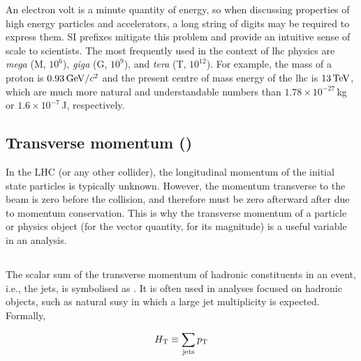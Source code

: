 An electron volt is a minute quantity of energy, so when discussing properties of high energy particles and accelerators, a long string of digits may be required to express them. SI prefixes mitigate this problem and provide an intuitive sense of scale to scientists. The most frequently used in the context of \acrshort{lhc} physics are \emph{mega} (M, $\text{10}^6$), \emph{giga} (G, $\text{10}^9$), and \emph{tera} (T, $\text{10}^{12}$). For example, the mass of a proton is $\text{0.93}\,\text{Ge\hspace{-.08em}V}/c^2$ and the present centre of mass energy of the \acrshort{lhc} is $\text{13}\,\text{Te\hspace{-.08em}V}$, which are much more natural and understandable numbers than $\text{1.78}\times \text{10}^{-27}$\,kg or $\text{1.6}\times \text{10}^{-7}$\,J, respectively.




\subsection{Transverse momentum (\texorpdfstring{\pt}{pt})}
\label{subsec:theory_pt}

In the LHC (or any other collider), the longitudinal momentum of the initial state particles is typically unknown. However, the momentum transverse to the beam is zero before the collision, and therefore must be zero afterward after due to momentum conservation. This is why the transverse momentum of a particle or physics object (\ptvec for the vector quantity, \pt for its magnitude) is a useful variable in an analysis.





\subsection{\texorpdfstring{\HT}{HT}}
\label{subsec:theory_ht}


The scalar sum of the transverse momentum of hadronic constituents in an event, i.e., the \glspl{jet}, is symbolised as \HT. It is often used in analyses focused on hadronic objects, such as natural \acrlong{susy} in which a large jet multiplicity is expected. Formally,

\begin{equation}
    H_{\mathrm{T}} \equiv \sum_{\mathrm{jets}} p_{\mathrm{T}}
    \label{eq:ht_definition}
\end{equation}

